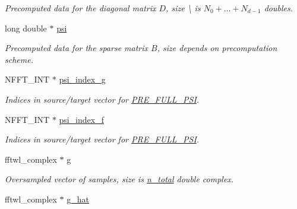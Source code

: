 \begin{DoxyCompactItemize}
\begin{DoxyCompactList}\small\item\em Precomputed data for the diagonal matrix $D$, size \textbackslash{} is $N_0+\dots+N_{d-1}$ doubles. \end{DoxyCompactList}\item 
\hypertarget{structnfftl__plan_a33955562ecf9b48f4283f869c77f96ff}{long double $\ast$ \hyperlink{structnfftl__plan_a33955562ecf9b48f4283f869c77f96ff}{psi}}\label{structnfftl__plan_a33955562ecf9b48f4283f869c77f96ff}

\begin{DoxyCompactList}\small\item\em Precomputed data for the sparse matrix $B$, size depends on precomputation scheme. \end{DoxyCompactList}\item 
\hypertarget{structnfftl__plan_a5d2c11f962695bfb84568973deb7af38}{N\-F\-F\-T\-\_\-\-I\-N\-T $\ast$ \hyperlink{structnfftl__plan_a5d2c11f962695bfb84568973deb7af38}{psi\-\_\-index\-\_\-g}}\label{structnfftl__plan_a5d2c11f962695bfb84568973deb7af38}

\begin{DoxyCompactList}\small\item\em Indices in source/target vector for \hyperlink{group__nfft_ga7ad8a7e19519b16340dabec48899c6a4}{P\-R\-E\-\_\-\-F\-U\-L\-L\-\_\-\-P\-S\-I}. \end{DoxyCompactList}\item 
\hypertarget{structnfftl__plan_a05aef145738a60ccb8e7255a066c9103}{N\-F\-F\-T\-\_\-\-I\-N\-T $\ast$ \hyperlink{structnfftl__plan_a05aef145738a60ccb8e7255a066c9103}{psi\-\_\-index\-\_\-f}}\label{structnfftl__plan_a05aef145738a60ccb8e7255a066c9103}

\begin{DoxyCompactList}\small\item\em Indices in source/target vector for \hyperlink{group__nfft_ga7ad8a7e19519b16340dabec48899c6a4}{P\-R\-E\-\_\-\-F\-U\-L\-L\-\_\-\-P\-S\-I}. \end{DoxyCompactList}\item 
\hypertarget{structnfftl__plan_aa442607f39ed01885dbeb286b18b1b77}{fftwl\-\_\-complex $\ast$ \hyperlink{structnfftl__plan_aa442607f39ed01885dbeb286b18b1b77}{g}}\label{structnfftl__plan_aa442607f39ed01885dbeb286b18b1b77}

\begin{DoxyCompactList}\small\item\em Oversampled vector of samples, size is \hyperlink{structnfftl__plan_afbc61ba78ca220fc8d6c72624772f991}{n\-\_\-total} double complex. \end{DoxyCompactList}\item 
\hypertarget{structnfftl__plan_af708c1c479196fb4e3ded3d289085b5e}{fftwl\-\_\-complex $\ast$ \hyperlink{structnfftl__plan_af708c1c479196fb4e3ded3d289085b5e}{g\-\_\-hat}}\label{structnfftl__plan_af708c1c479196fb4e3ded3d289085b5e}


\end{DoxyCompactItemize}
